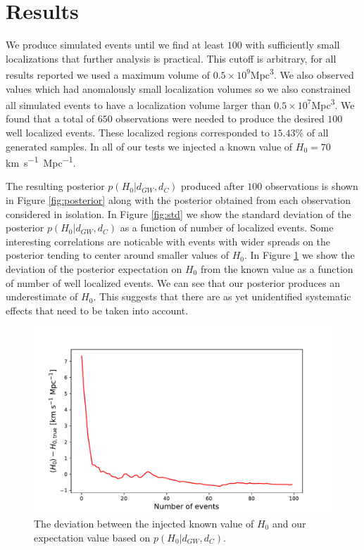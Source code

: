 \section{Results} \label{sec:conclusions}
We produce simulated events until we find at least $100$ with sufficiently small localizations that further analysis is practical. This cutoff is arbitrary, for all results reported we used a maximum volume of $0.5\times 10^{9}$\si{Mpc^3}. We also observed values which had anomalously small localization volumes so we also constrained all simulated events to have a localization volume larger than $0.5\times 10^{7}$\si{Mpc^3}. We found that a total of $650$ observations were needed to produce the desired $100$ well localized events. These localized regions corresponded to $15.43\%$ of all generated samples. In all of our tests we injected a known value of $H_0=70$\si{km.s^{-1}.Mpc^{-1}}.

The resulting posterior $p(H_0 | d_{GW}, d_C)$ produced after $100$ observations is shown in Figure \ref{fig:posterior} along with the posterior obtained from each observation considered in isolation. In Figure \ref{fig:std} we show the standard deviation of the posterior $p(H_0 | d_{GW}, d_C)$ as a function of number of localized events. Some interesting correlations are noticable with events with wider spreads on the posterior tending to center around smaller values of $H_0$. In Figure \ref{fig:mean_diff} we show the deviation of the posterior expectation on $H_0$ from the known value as a function of number of well localized events. We can see that our posterior produces an underestimate of $H_0$. This suggests that there are as yet unidentified systematic effects that need to be taken into account. 

\begin{figure}
    \centering
    \includegraphics[width=0.95\columnwidth]{figures/diff.pdf}
    \caption{The deviation between the injected known value of $H_0$ and our expectation value based on $p(H_0 | d_{GW}, d_C)$.}
    \label{fig:mean_diff}
\end{figure}

